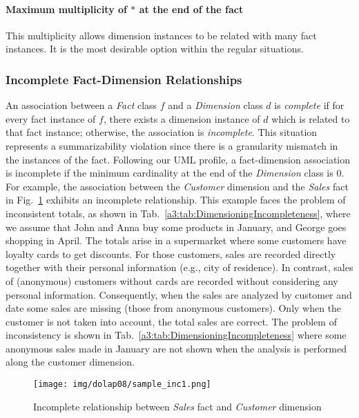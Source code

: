 \paragraph{Maximum multiplicity of $*$ at the end of the fact} This multiplicity
allows dimension instances to be related with many fact instances.
It is the most desirable option within the regular situations.

\subsubsection{Incomplete Fact-Dimension Relationships} An
association between a \emph{Fact} class $f$ and a \emph{Dimension}
class $d$ is \emph{complete} if for every fact instance of $f$,
there exists a dimension instance of $d$ which is related to that
fact instance; otherwise, the association is \emph{incomplete}. This
situation represents a summarizability violation since there is a
granularity mismatch in the instances of the fact. Following our UML
profile, a fact-dimension association is incomplete if the minimum
cardinality at the end of the \emph{Dimension} class is $0$. For
example, the association between the \emph{Customer} dimension and
the \emph{Sales} fact in Fig.~\ref{a3:sample_inc1} exhibits an
incomplete relationship. This example faces the problem of
inconsistent totals, as shown in
Tab.~\ref{a3:tab:DimensioningIncompleteness}, where we assume that
John and Anna buy some products in January, and George goes shopping
in April. The totals arise in a supermarket where some customers
have loyalty cards to get discounts. For those customers, sales are
recorded directly together with their personal information (e.g.,
city of residence). In contrast, sales of (anonymous) customers
without cards are recorded without considering any personal
information. Consequently, when the sales are analyzed by customer
and date some sales are missing (those from anonymous customers).
Only when the customer is not taken into account, the total sales
are correct. The problem of inconsistency is shown in
Tab.~\ref{a3:tab:DimensioningIncompleteness} where some anonymous
sales made in January are not shown when the analysis is performed
along the customer dimension.

\begin{figure}
\begin{center}
\texttt{[image: img/dolap08/sample\_inc1.png]}
\end{center}
\caption{Incomplete relationship between \emph{Sales} fact and
\emph{Customer} dimension} \label{a3:sample_inc1}
\end{figure}


